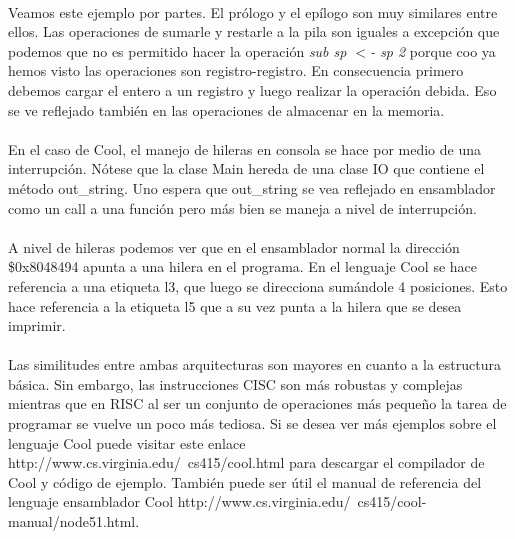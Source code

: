 \documentclass[10pt,a4paper]{article}
\begin{document}
\paragraph{}
Veamos este ejemplo por partes. El prólogo y el epílogo son muy similares entre ellos. Las operaciones de sumarle y restarle a la pila son iguales a excepción que podemos que no es permitido hacer la operación \textit{sub sp $<$- sp 2} porque coo ya hemos visto las operaciones son registro-registro. En consecuencia primero debemos cargar el entero a un registro y luego realizar la operación debida. Eso se ve reflejado también en las operaciones de almacenar en la memoria.

\paragraph{}
En el caso de Cool, el manejo de hileras en consola se hace por medio de una interrupción. Nótese que la clase Main hereda de una clase IO que contiene el método out\_string. Uno espera que out\_string se vea reflejado en ensamblador como un call a una función pero más bien se maneja a nivel de interrupción.

\paragraph{}
A nivel de hileras podemos ver que en el ensamblador normal la dirección \$0x8048494 apunta a una hilera en el programa. En el lenguaje Cool se hace referencia a una etiqueta l3, que luego se direcciona sumándole 4 posiciones. Esto hace referencia a la etiqueta l5 que a su vez punta a la hilera que se desea imprimir.

\paragraph{}
Las similitudes entre ambas arquitecturas son mayores en cuanto a la estructura básica. Sin embargo, las instrucciones CISC son más robustas y complejas mientras que en RISC al ser un conjunto de operaciones más pequeño la tarea de programar se vuelve un poco más tediosa. Si se desea ver más ejemplos sobre el lenguaje Cool puede visitar este enlace http://www.cs.virginia.edu/~cs415/cool.html para descargar el compilador de Cool y código de ejemplo. También puede ser útil el manual de referencia del lenguaje ensamblador Cool http://www.cs.virginia.edu/~cs415/cool-manual/node51.html.
\end{document}
